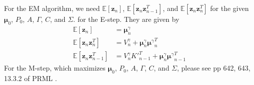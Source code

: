 \documentclass[a4]{article}
\begin{document}
For the EM algorithm, we need 
 $\mathbb{E}[\bm{z}_n]$, 
 $\mathbb{E}[\bm{z}_n\bm{z}_{n-1}^T]$, and
 $\mathbb{E}[\bm{z}_n\bm{z}_{n}^T]$ for the given $\bm{\mu}_0$, $P_0$, $A$, $\Gamma$, $C$, and $\Sigma$.
for the E-step.
They are given by
\begin{equation}
\begin{aligned}
\mathbb{E}[\bm{z}_n] &= \bm{\mu}^{\gamma}_n\\
\mathbb{E}[\bm{z}_n\bm{z}_{n}^T]  &= V^{\gamma}_{n} + \bm{\mu}^{\gamma}_n{\bm{\mu}^{\gamma}}^T_n\\
\mathbb{E}[\bm{z}_n\bm{z}_{n-1}^T] &=
 V^{\gamma}_{n}{K'}_{n-1}^T + \bm{\mu}^{\gamma}_n{\bm{\mu}^{\gamma}}^T_{n-1}
\end{aligned}
\end{equation}
For the M-step, which maximizes $\bm{\mu}_0$, $P_0$, $A$, $\Gamma$, $C$, and $\Sigma$, please see pp 642, 643, 13.3.2 of PRML \cite{bishop2007}.


{}

\end{document}
